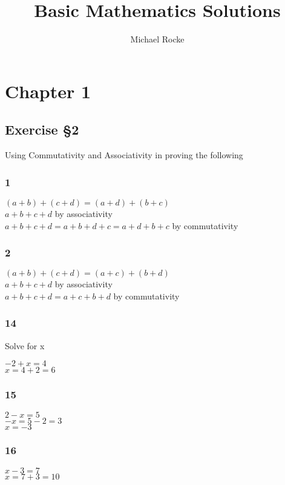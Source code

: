\documentclass[]{report}
\title{Basic Mathematics Solutions}
\author{Michael Rocke}
\begin{document}
\maketitle

\section{Chapter 1}

\subsection{Exercise §2}

Using Commutativity and Associativity in proving the following
\subsubsection{1}
$ (a+b) + (c+d) = (a+d) + (b+c) $ \\
$ a + b + c + d $ by associativity \\
$ a + b + c + d = a + b + d + c = a + d + b + c $ by commutativity\\

\subsubsection{2}
$ (a + b) + (c + d) = (a + c) + (b + d) $ \\
$ a + b + c + d $ by associativity \\
$ a + b + c + d  = a + c + b + d $ by commutativity

\subsubsection{14} Solve for x

$ -2 + x = 4 $ \\
$ x = 4 + 2  = 6$ 

\subsubsection{15}
$ 2 - x = 5 $\\
$ -x = 5 - 2 = 3$\\
$ x = -3 $\\

\subsubsection{16}
$ x - 3 = 7 $ \\
$ x = 7 + 3 = 10 $
\end{document}
